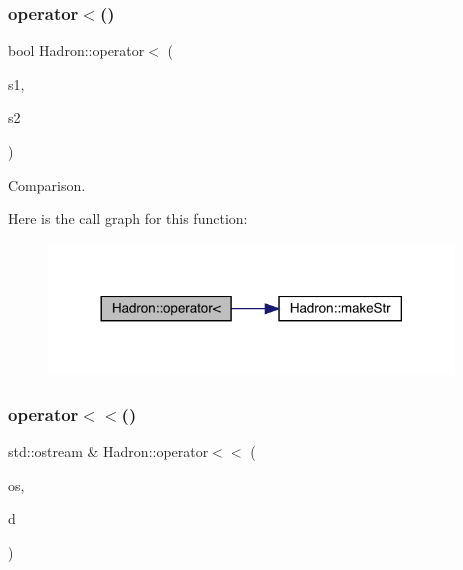 \subsubsection{\texorpdfstring{operator$<$()}{operator<()}}
{\footnotesize\ttfamily bool Hadron\+::operator$<$ (\begin{DoxyParamCaption}\item[{const \mbox{\hyperlink{structHadron_1_1HadronVertex__t}{Hadron\+Vertex\+\_\+t}} \&}]{s1,  }\item[{const \mbox{\hyperlink{structHadron_1_1HadronVertex__t}{Hadron\+Vertex\+\_\+t}} \&}]{s2 }\end{DoxyParamCaption})}



Comparison. 

Here is the call graph for this function\+:\nopagebreak
\begin{figure}[H]
\begin{center}
\leavevmode
\includegraphics[width=305pt]{d1/daf/namespaceHadron_a43c37405dc872b3d2d1f477ca914424a_cgraph}
\end{center}
\end{figure}
\mbox{\label{namespaceHadron_ab6f642c04562e34b1b2aa6e4bcfa60e7}} 
\subsubsection{\texorpdfstring{operator$<$$<$()}{operator<<()}\hspace{0.1cm}{\footnotesize\ttfamily [1/48]}}
{\footnotesize\ttfamily std\+::ostream \& Hadron\+::operator$<$$<$ (\begin{DoxyParamCaption}\item[{std\+::ostream \&}]{os,  }\item[{const \mbox{\hyperlink{structHadron_1_1ValTimeSlice__t}{Val\+Time\+Slice\+\_\+t}} \&}]{d }\end{DoxyParamCaption})}



